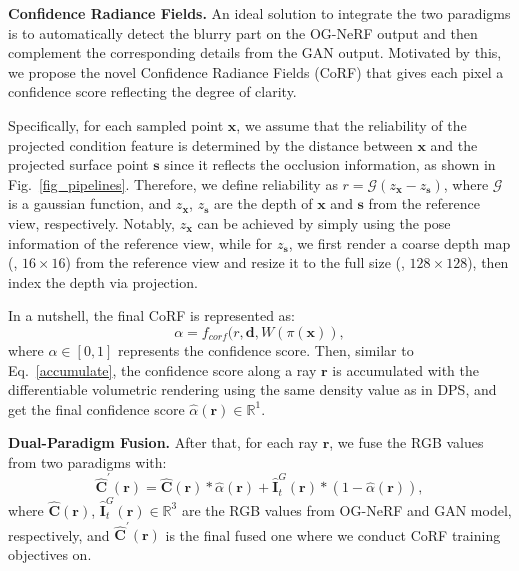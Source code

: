 \vspace{0.1cm}
\noindent\textbf{Confidence Radiance Fields.}
An ideal solution to integrate the two paradigms is to automatically detect the blurry part on the OG-NeRF output and then complement the corresponding details from the GAN output. Motivated by this, we propose the novel Confidence Radiance Fields (CoRF) that gives each pixel a confidence score reflecting the degree of clarity. 


Specifically, for each sampled point $\textbf{x}$, 
we assume that the reliability of
the projected condition feature 
is determined by the distance between $\textbf{x}$ and the projected surface point $\textbf{s}$ since it reflects the occlusion information, as shown in Fig.~\ref{fig_pipelines}. Therefore, we define reliability as
    $r = \mathcal{G}(z_{\textbf{x}} - z_{\textbf{s}})$,
where $\mathcal{G}$ is a gaussian function, and $z_{\textbf{x}}$, $z_{\textbf{s}}$ are the depth of $\textbf{x}$ and $\textbf{s}$ from the reference view, respectively. Notably, $z_{\textbf{x}}$ can be achieved by simply using the pose information of the reference view,  while for $z_{\textbf{s}}$, we first render a coarse depth map (\eg, $16\times16$) from the reference view and resize it to the full size (\eg, $128\times128$), then index the depth via projection.


In a nutshell, the final CoRF is represented as:
\begin{equation}
    \alpha  =  f_{corf}(r, \textbf{d}, W(\pi(\textbf{x})),
\end{equation}
where $\alpha \in [0,1]$ represents the confidence score. Then, similar to Eq.~\ref{accumulate}, the confidence score along a ray $\textbf{r}$ is accumulated with the differentiable volumetric rendering using the same density value as in DPS, and get the final confidence score $\hat{\alpha}(\textbf{r}) \in \mathbb{R}^1$.

\vspace{0.1cm}
\noindent\textbf{Dual-Paradigm Fusion.}
After that, for each ray $\textbf{r}$, we fuse the RGB values from two paradigms with:
\begin{equation}
    \hat{\textbf{C}}^{'}(\textbf{r}) = \hat{\textbf{C}}(\textbf{r}) * \hat{\alpha}(\textbf{r})  +  \hat{\textbf{I}}_t^{G}(\textbf{r}) * (1 - \hat{\alpha}(\textbf{r}) ), 
\end{equation}
where $\hat{\textbf{C}}(\textbf{r})$, $\hat{\textbf{I}}_t^{G}(\textbf{r}) \in \mathbb{R}^3$ are the RGB values from OG-NeRF and GAN model, respectively, and $\hat{\textbf{C}}^{'}(\textbf{r})$ is the final fused one where we conduct CoRF training objectives on. 


